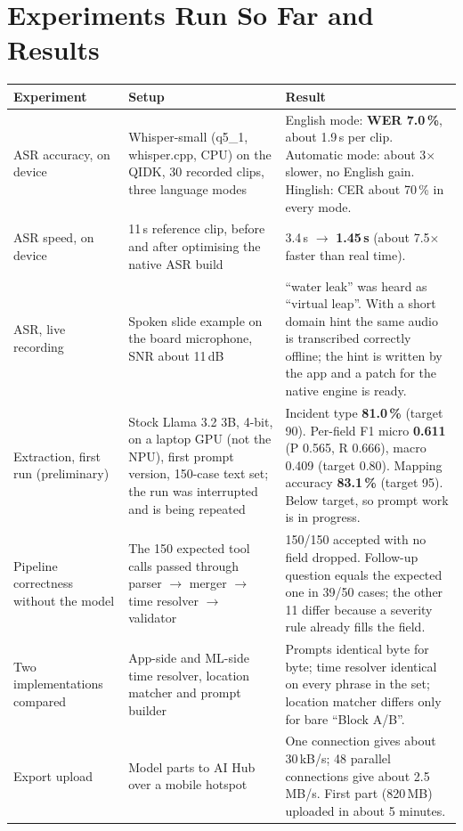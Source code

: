 \documentclass[9pt,a4paper]{extarticle}
\begin{document}
\section{Experiments Run So Far and Results}
\begin{tabularx}{\linewidth}{@{}p{3.3cm}p{5.2cm}L@{}}
\toprule
\textbf{Experiment} & \textbf{Setup} & \textbf{Result}\\
\midrule
ASR accuracy, on device & Whisper-small (q5\_1, whisper.cpp, CPU) on the QIDK, 30 recorded clips, three language modes & English mode: \textbf{WER 7.0\,\%}, about 1.9\,s per clip. Automatic mode: about 3$\times$ slower, no English gain. Hinglish: CER about 70\,\% in every mode.\\
ASR speed, on device & 11\,s reference clip, before and after optimising the native ASR build & 3.4\,s $\rightarrow$ \textbf{1.45\,s} (about 7.5$\times$ faster than real time).\\
ASR, live recording & Spoken slide example on the board microphone, SNR about 11\,dB & ``water leak'' was heard as ``virtual leap''. With a short domain hint the same audio is transcribed correctly offline; the hint is written by the app and a patch for the native engine is ready.\\
Extraction, first run (preliminary) & Stock Llama 3.2 3B, 4-bit, on a laptop GPU (not the NPU), first prompt version, 150-case text set; the run was interrupted and is being repeated & Incident type \textbf{81.0\,\%} (target 90). Per-field F1 micro \textbf{0.611} (P 0.565, R 0.666), macro 0.409 (target 0.80). Mapping accuracy \textbf{83.1\,\%} (target 95). Below target, so prompt work is in progress.\\
Pipeline correctness without the model & The 150 expected tool calls passed through parser $\rightarrow$ merger $\rightarrow$ time resolver $\rightarrow$ validator & 150/150 accepted with no field dropped. Follow-up question equals the expected one in 39/50 cases; the other 11 differ because a severity rule already fills the field.\\
Two implementations compared & App-side and ML-side time resolver, location matcher and prompt builder & Prompts identical byte for byte; time resolver identical on every phrase in the set; location matcher differs only for bare ``Block A/B''.\\
Export upload & Model parts to AI Hub over a mobile hotspot & One connection gives about 30\,kB/s; 48 parallel connections give about 2.5\,MB/s. First part (820\,MB) uploaded in about 5 minutes.\\
\bottomrule
\end{tabularx}
\end{document}
